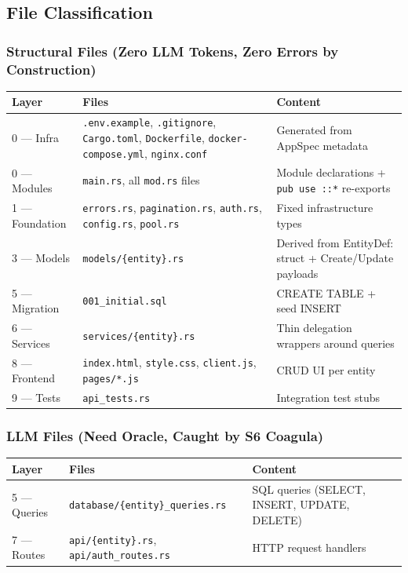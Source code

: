 \documentclass[11pt,a4paper]{article}
\begin{document}
\subsection{File Classification}

\subsubsection{Structural Files (Zero LLM Tokens, Zero Errors by Construction)}

\begin{center}
\small
\begin{tabular}{l l p{7cm}}
\toprule
\textbf{Layer} & \textbf{Files} & \textbf{Content} \\
\midrule
0 --- Infra & \texttt{.env.example}, \texttt{.gitignore}, \texttt{Cargo.toml}, \texttt{Dockerfile}, \texttt{docker-compose.yml}, \texttt{nginx.conf} & Generated from AppSpec metadata \\
0 --- Modules & \texttt{main.rs}, all \texttt{mod.rs} files & Module declarations + \texttt{pub use ::*} re-exports \\
1 --- Foundation & \texttt{errors.rs}, \texttt{pagination.rs}, \texttt{auth.rs}, \texttt{config.rs}, \texttt{pool.rs} & Fixed infrastructure types \\
3 --- Models & \texttt{models/\{entity\}.rs} & Derived from EntityDef: struct + Create/Update payloads \\
5 --- Migration & \texttt{001\_initial.sql} & CREATE TABLE + seed INSERT \\
6 --- Services & \texttt{services/\{entity\}.rs} & Thin delegation wrappers around queries \\
8 --- Frontend & \texttt{index.html}, \texttt{style.css}, \texttt{client.js}, \texttt{pages/*.js} & CRUD UI per entity \\
9 --- Tests & \texttt{api\_tests.rs} & Integration test stubs \\
\bottomrule
\end{tabular}
\end{center}

\subsubsection{LLM Files (Need Oracle, Caught by S6 Coagula)}

\begin{center}
\small
\begin{tabular}{l l p{7cm}}
\toprule
\textbf{Layer} & \textbf{Files} & \textbf{Content} \\
\midrule
5 --- Queries & \texttt{database/\{entity\}\_queries.rs} & SQL queries (SELECT, INSERT, UPDATE, DELETE) \\
7 --- Routes & \texttt{api/\{entity\}.rs}, \texttt{api/auth\_routes.rs} & HTTP request handlers \\
\bottomrule
\end{tabular}
\end{center}
\end{document}
